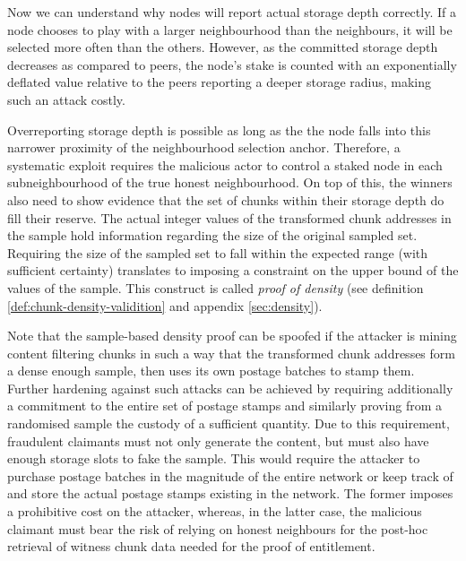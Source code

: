 Now we can understand why nodes will report actual storage depth correctly. If a node chooses to play with a larger neighbourhood than the neighbours, it will be selected more often than the others. However, as the committed storage depth decreases as compared to peers, the node's stake is counted with an exponentially deflated  value relative to the peers reporting a deeper storage radius, making such an attack costly.  

Overreporting storage depth is possible as long as the the node falls into this narrower proximity of the neighbourhood selection anchor. Therefore, a systematic exploit requires the malicious actor to control a staked node in each subneighbourhood of the true honest neighbourhood. 
On top of this, the winners also need to show evidence that the set of chunks within their storage depth do fill their reserve. 
The actual integer values of the transformed chunk addresses in the sample hold information regarding the size of the original sampled set.  
Requiring the size of the sampled set to fall within the expected range (with sufficient certainty) translates to imposing a constraint on the upper bound of the values of the sample. This construct is called \emph{proof of density} (see definition \ref{def:chunk-density-validition} and appendix \ref{sec:density}).
%

Note that the sample-based density proof can be spoofed if the attacker is mining content filtering chunks in such a way that the transformed chunk addresses form a dense enough sample, then uses its own postage batches to stamp them. 
Further hardening against such attacks can be achieved by requiring  additionally a commitment to the entire set of postage stamps and similarly proving from a randomised sample the custody of a sufficient quantity. Due to this requirement, fraudulent claimants must not only generate the content, but must also have enough storage slots to fake the sample. This would require the attacker to purchase postage batches in the magnitude of the entire network 
or keep track of and store the actual postage stamps existing in the network. The former imposes a prohibitive cost on the attacker, whereas, in the latter case, the malicious claimant must bear the risk of relying on honest  neighbours for the post-hoc retrieval of witness chunk data needed for the proof of entitlement.



